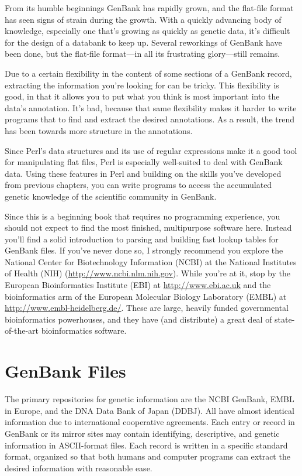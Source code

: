 From its humble beginnings GenBank has rapidly grown, and the flat-file format has seen signs of strain during the growth. With a quickly advancing body of knowledge, especially one that's growing as quickly as genetic data, it's difficult for the design of a databank to keep up. Several reworkings of GenBank have been done, but the flat-file format—in all its frustrating glory—still remains.

Due to a certain flexibility in the content of some sections of a GenBank record, extracting the information you're looking for can be tricky. This flexibility is good, in that it allows you to put what you think is most important into the data's annotation. It's bad, because that same flexibility makes it harder to write programs that to find and extract the desired annotations. As a result, the trend has been towards more structure in the annotations.

Since Perl's data structures and its use of regular expressions make it a good tool for manipulating flat files, Perl is especially well-suited to deal with GenBank data. Using these features in Perl and building on the skills you've developed from previous chapters, you can write programs to access the accumulated genetic knowledge of the scientific community in GenBank.

Since this is a beginning book that requires no programming experience, you should not expect to find the most finished, multipurpose software here. Instead you'll find a solid introduction to parsing and building fast lookup tables for GenBank files. If you've never done so, I strongly recommend you explore the National Center for Biotechnology Information (NCBI) at the National Institutes of Health (NIH) (\href{http://www.ncbi.nlm.nih.gov}{http://www.ncbi.nlm.nih.gov}). While you're at it, stop by the European Bioinformatics Institute (EBI) at \href{http://www.ebi.ac.uk}{http://www.ebi.ac.uk} and the bioinformatics arm of the European Molecular Biology Laboratory (EMBL) at \href{http://www.embl-heidelberg.de/}{http://www.embl-heidelberg.de/}. These are large, heavily funded governmental bioinformatics powerhouses, and they have (and distribute) a great deal of state-of-the-art bioinformatics software. 

\section{GenBank Files}
The primary repositories for genetic information are the NCBI GenBank, EMBL in Europe, and the DNA Data Bank of Japan (DDBJ). All have almost identical information due to international cooperative agreements. Each entry or record in GenBank or its mirror sites may contain identifying, descriptive, and genetic information in ASCII-format files. Each record is written in a specific standard format, organized so that both humans and computer programs can extract the desired information with reasonable ease.

